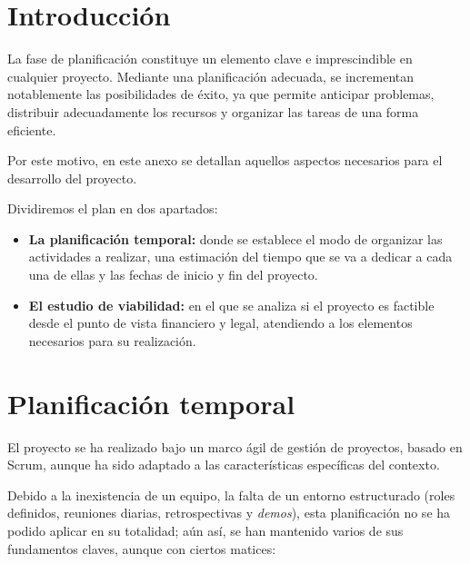 
\section{Introducción}

La fase de planificación constituye un elemento clave e imprescindible en cualquier proyecto.
Mediante una planificación adecuada, se incrementan notablemente las posibilidades de éxito, ya
que permite anticipar problemas, distribuir adecuadamente los recursos y organizar las tareas de una
forma eficiente.

Por este motivo, en este anexo se detallan aquellos aspectos necesarios para el desarrollo
del proyecto.

Dividiremos el plan en dos apartados:
\begin{itemize}
    \item \textbf{La planificación temporal:} donde se establece el modo de organizar las actividades a realizar,
    una estimación del tiempo que se va a dedicar a cada una de ellas y las fechas de inicio y fin del proyecto.
    \item \textbf{El estudio de viabilidad:} en el que se analiza si el proyecto es factible desde el punto de vista
financiero y legal, atendiendo a los elementos necesarios para su realización.
\end{itemize}

\section{Planificación temporal}

El proyecto se ha realizado bajo un marco ágil de gestión de proyectos, basado en Scrum, aunque ha sido adaptado a las
características específicas del contexto.


Debido a la inexistencia de un equipo, la falta de un entorno estructurado (roles definidos, reuniones diarias, retrospectivas
y \textit{demos}), esta planificación no se ha podido aplicar en su totalidad; aún así, se han mantenido varios de sus
fundamentos claves, aunque con ciertos matices:

